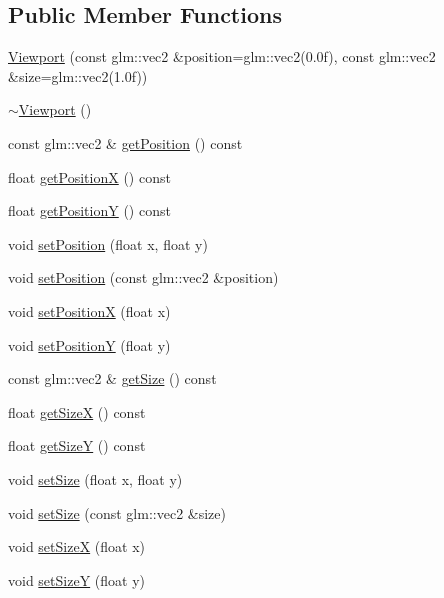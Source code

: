 \subsection*{Public Member Functions}
\begin{DoxyCompactItemize}
\item 
\mbox{\hyperlink{classec_1_1_viewport_a287d09d9303d9fbbea3c915f832d2ab8}{Viewport}} (const glm\+::vec2 \&position=glm\+::vec2(0.\+0f), const glm\+::vec2 \&size=glm\+::vec2(1.\+0f))
\item 
\mbox{\hyperlink{classec_1_1_viewport_a65341c63372c6158a0a2932fa1f2c66b}{$\sim$\+Viewport}} ()
\item 
const glm\+::vec2 \& \mbox{\hyperlink{classec_1_1_viewport_a49643e5dae2f5813280b5adf34c28e59}{get\+Position}} () const
\item 
float \mbox{\hyperlink{classec_1_1_viewport_a304136185660866e1df70b4f2d74f5c6}{get\+PositionX}} () const
\item 
float \mbox{\hyperlink{classec_1_1_viewport_a6c8e4dc096406135b485347a8e458ddc}{get\+PositionY}} () const
\item 
void \mbox{\hyperlink{classec_1_1_viewport_a0bccb794bc85e2c2e8417ab142ceadbc}{set\+Position}} (float x, float y)
\item 
void \mbox{\hyperlink{classec_1_1_viewport_a8ab2259a78b8b9aeebd3b4450ce2cdd2}{set\+Position}} (const glm\+::vec2 \&position)
\item 
void \mbox{\hyperlink{classec_1_1_viewport_a2fd67017414985517470b75afb3402a7}{set\+PositionX}} (float x)
\item 
void \mbox{\hyperlink{classec_1_1_viewport_a754e8f6f4b857c70b598dc3bf5a7badd}{set\+PositionY}} (float y)
\item 
const glm\+::vec2 \& \mbox{\hyperlink{classec_1_1_viewport_a8f56fdabf8e67580a96e9dee4e9e359f}{get\+Size}} () const
\item 
float \mbox{\hyperlink{classec_1_1_viewport_ae5eab9f39747421f0669aef7a8126a70}{get\+SizeX}} () const
\item 
float \mbox{\hyperlink{classec_1_1_viewport_aa02139fb9d8927b744ab3442088330fb}{get\+SizeY}} () const
\item 
void \mbox{\hyperlink{classec_1_1_viewport_a72cca5d2d2eb6fee38a28c27ffc8b395}{set\+Size}} (float x, float y)
\item 
void \mbox{\hyperlink{classec_1_1_viewport_ad8e05ac01f4c19c599f6b7dc344b815c}{set\+Size}} (const glm\+::vec2 \&size)
\item 
void \mbox{\hyperlink{classec_1_1_viewport_af1bcf1e3a8a06458c41a0c646b5f2057}{set\+SizeX}} (float x)
\item 
void \mbox{\hyperlink{classec_1_1_viewport_ae9420c066d2bf6f1a6cc5c0b65092862}{set\+SizeY}} (float y)
\end{DoxyCompactItemize}


